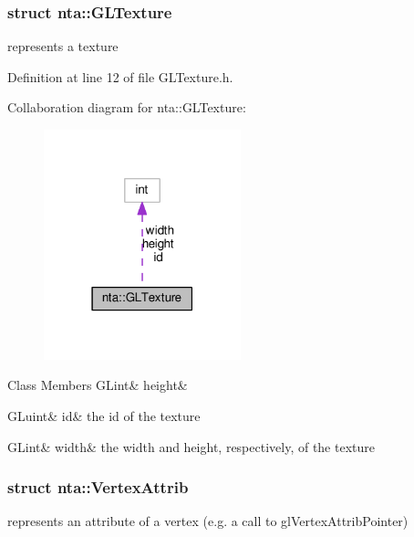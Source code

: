 \subsubsection{struct nta\+:\+:G\+L\+Texture}
represents a texture 

Definition at line 12 of file G\+L\+Texture.\+h.



Collaboration diagram for nta\+:\+:G\+L\+Texture\+:\nopagebreak
\begin{figure}[H]
\begin{center}
\leavevmode
\includegraphics[width=162pt]{d3/d3e/structnta_1_1GLTexture__coll__graph}
\end{center}
\end{figure}
\begin{DoxyFields}{Class Members}
\mbox{\label{namespacenta_a4ac2e45733ffb16238eb696d663e62a1}} 
GLint&
height&
\\
\hline

\mbox{\label{namespacenta_aaf0d536088f4b1062d996679b217c0f9}} 
GLuint&
id&
the id of the texture \\
\hline

\mbox{\label{namespacenta_a8f4d13ab2b19b700f76334c46458ac48}} 
GLint&
width&
the width and height, respectively, of the texture \\
\hline

\end{DoxyFields}
\label{structnta_1_1VertexAttrib}
\subsubsection{struct nta\+:\+:Vertex\+Attrib}
represents an attribute of a vertex (e.\+g. a call to gl\+Vertex\+Attrib\+Pointer) 

